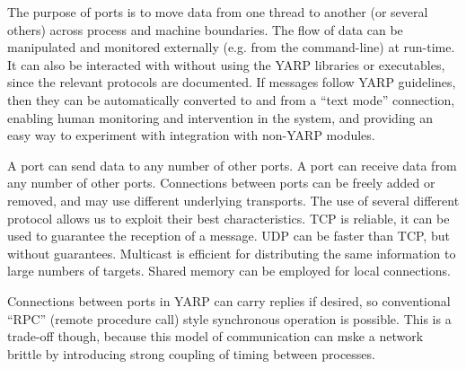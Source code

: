 The purpose of ports is to move data from one thread to another (or
several others) across process and machine boundaries. The flow of
data can be manipulated and monitored externally (e.g. from the
command-line) at run-time.  It can also be interacted with without
using the YARP libraries or executables, since the relevant protocols
are documented.  If messages follow YARP guidelines, then they can be
automatically converted to and from a ``text mode'' connection, 
enabling human monitoring and intervention in the system,
and providing an easy way to experiment with integration with
non-YARP modules.

A port can send data to any number of other ports. A port can receive
data from any number of other ports. Connections between ports can be
freely added or removed, and may use different underlying transports.
The use of several different protocol allows us to exploit their best
characteristics.  TCP is reliable, it can be used to guarantee the
reception of a message.  UDP can be faster than TCP, but without
guarantees.  Multicast is efficient for distributing the same
information to large numbers of targets.  Shared memory can be
employed for local connections.






Connections between ports in YARP can carry replies if desired,
so conventional ``RPC'' (remote procedure call) style synchronous
operation is possible.  This is a trade-off though, because this
model of communication can mske a network brittle by introducing
strong coupling of timing between processes.

